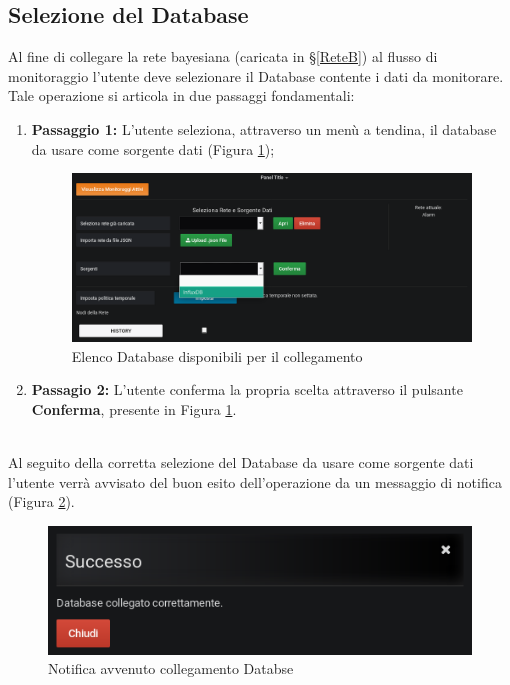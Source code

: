 \subsection{Selezione del Database}\label{SelectDB}

Al fine di collegare la rete bayesiana (caricata in §\ref{ReteB}) al flusso di monitoraggio l'utente deve selezionare il Database contente i dati da monitorare.\\
Tale operazione si articola in due passaggi fondamentali:
\begin{enumerate}
	\item \textbf{Passaggio 1:} L'utente seleziona, attraverso un menù a tendina, il database da usare come sorgente dati (Figura \ref{Sorgenti});
	\begin{figure}[H]
	\begin{center}
		\includegraphics[scale=0.35]{./images/Sorgenti.png}
		 \caption{Elenco Database disponibili per il collegamento}	
		 \label{Sorgenti}
	\end{center}
	\end{figure}
	\item \textbf{Passagio 2:} L'utente conferma la propria scelta attraverso il pulsante \textbf{Conferma}, presente in Figura \ref{Sorgenti}.
\end{enumerate}
~\\
Al seguito della corretta selezione del Database da usare come sorgente dati l'utente verrà avvisato del buon esito dell'operazione da un messaggio di notifica (Figura \ref{NotificaSorgente}). 

\begin{figure}[H]
	\begin{center}
		\includegraphics[scale=0.6]{./images/NotificaSorgente.png}
		 \caption{Notifica avvenuto collegamento Databse}	
		 \label{NotificaSorgente}
	\end{center}
\end{figure}